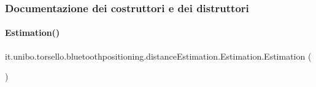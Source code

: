 \subsubsection{Documentazione dei costruttori e dei distruttori}
\hypertarget{classit_1_1unibo_1_1torsello_1_1bluetoothpositioning_1_1distanceEstimation_1_1Estimation_abd84ded1e26d40304606ce0572735106_abd84ded1e26d40304606ce0572735106}{}\label{classit_1_1unibo_1_1torsello_1_1bluetoothpositioning_1_1distanceEstimation_1_1Estimation_abd84ded1e26d40304606ce0572735106_abd84ded1e26d40304606ce0572735106} 
\paragraph{\texorpdfstring{Estimation()}{Estimation()}}
{\footnotesize\ttfamily it.\+unibo.\+torsello.\+bluetoothpositioning.\+distance\+Estimation.\+Estimation.\+Estimation (\begin{DoxyParamCaption}{ }\end{DoxyParamCaption})}


